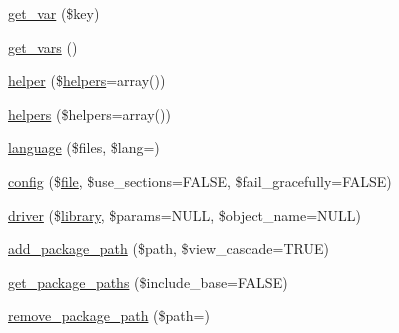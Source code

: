 \begin{DoxyCompactItemize}
\item 
\mbox{\hyperlink{class_c_i___loader_a0a078042b509f58c535a1664e90476e5}{get\+\_\+var}} (\$key)
\item 
\mbox{\hyperlink{class_c_i___loader_a81b647ad4f0ef893712facd67cb07d4f}{get\+\_\+vars}} ()
\item 
\mbox{\hyperlink{class_c_i___loader_a8f3936d69b6c7297131594642bb7037d}{helper}} (\$\mbox{\hyperlink{class_c_i___loader_a995cb4340d1b9c5879ce11eb64ec116e}{helpers}}=array())
\item 
\mbox{\hyperlink{class_c_i___loader_a995cb4340d1b9c5879ce11eb64ec116e}{helpers}} (\$helpers=array())
\item 
\mbox{\hyperlink{class_c_i___loader_a113081423f92eee712704dca59e0bba1}{language}} (\$files, \$lang=\textquotesingle{}\textquotesingle{})
\item 
\mbox{\hyperlink{class_c_i___loader_ab9f1da83fcb2e2177ab64bbf3587da0b}{config}} (\$\mbox{\hyperlink{class_c_i___loader_a7b2a676fae23b6a49a8eef9ff7f18e13}{file}}, \$use\+\_\+sections=F\+A\+L\+SE, \$fail\+\_\+gracefully=F\+A\+L\+SE)
\item 
\mbox{\hyperlink{class_c_i___loader_a4158ef7ff48f072315ffda808aeb666f}{driver}} (\$\mbox{\hyperlink{class_c_i___loader_a83b0240592edae85ace9467989c33688}{library}}, \$params=N\+U\+LL, \$object\+\_\+name=N\+U\+LL)
\item 
\mbox{\hyperlink{class_c_i___loader_aac0a4517f5d7723a1d2e968e8da4e468}{add\+\_\+package\+\_\+path}} (\$path, \$view\+\_\+cascade=T\+R\+UE)
\item 
\mbox{\hyperlink{class_c_i___loader_ab0cb9343d5bac0a9baaf859bbbbb3a84}{get\+\_\+package\+\_\+paths}} (\$include\+\_\+base=F\+A\+L\+SE)
\item 
\mbox{\hyperlink{class_c_i___loader_a44ebb8da6ab6cb3b07fcb5f0f48d11e5}{remove\+\_\+package\+\_\+path}} (\$path=\textquotesingle{}\textquotesingle{})
\end{DoxyCompactItemize}
